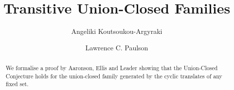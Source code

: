 \documentclass[11pt,a4paper]{article}
\begin{document}
\title{Transitive Union-Closed Families}
\author[1,2]{Angeliki Koutsoukou-Argyraki}
\author[2]{Lawrence C. Paulson}
\maketitle

\begin{abstract}
We formalise a proof by Aaronson, Ellis and Leader showing that the Union-Closed Conjecture 
holds for the union-closed family generated by the cyclic translates of any fixed set. 
\end{abstract}

\tableofcontents





\end{document}
